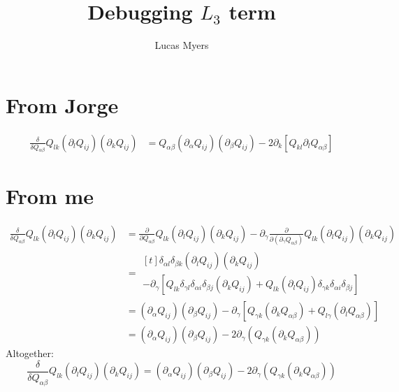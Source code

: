 \documentclass[reqno]{article}
\begin{document}
\title{Debugging $L_3$ term}
\author{Lucas Myers}
\maketitle

\section{From Jorge}

\begin{equation}
\begin{split}
    \frac{\delta}{\delta Q_{\alpha \beta}} Q_{lk} (\partial_{l}Q_{ij})(\partial_{k}Q_{ij})
    &=
    Q_{\alpha\beta} (\partial_\alpha Q_{ij})(\partial_\beta Q_{ij})
    - 2 \partial_k [Q_{kl} \partial_l Q_{\alpha \beta}]
\end{split}
\end{equation}

\section{From me}

\begin{equation}
\begin{split}
    \frac{\delta}{\delta Q_{\alpha \beta}} Q_{lk} \left( \partial_l Q_{ij} \right) \left( \partial_k Q_{ij} \right)
    &=
    \frac{\partial}{\partial Q_{\alpha \beta}} Q_{lk} \left( \partial_l Q_{ij} \right) \left( \partial_k Q_{ij} \right) 
    - \partial_\gamma \frac{\partial}{\partial \left(\partial_\gamma Q_{\alpha \beta} \right)}
    Q_{lk} \left( \partial_l Q_{ij} \right) \left( \partial_k Q_{ij} \right) \\
    &=
    \begin{multlined}[t]
    \delta_{\alpha l} \delta_{\beta k} \left( \partial_l Q_{ij} \right) \left( \partial_k Q_{ij} \right) \\
    - \partial_\gamma \left[ Q_{lk} \delta_{\gamma l} \delta_{\alpha i} \delta_{\beta j} \left( \partial_k Q_{ij} \right)
    + Q_{lk} \left( \partial_l Q_{ij} \right) \delta_{\gamma k } \delta_{\alpha i} \delta_{\beta j}
    \right]
    \end{multlined} \\
    &= 
    \left( \partial_\alpha Q_{ij} \right) \left( \partial_\beta Q_{ij} \right)
    - \partial_\gamma \left[ Q_{\gamma k} \left( \partial_k Q_{\alpha \beta} \right)
    + Q_{l \gamma} \left( \partial_l Q_{\alpha \beta} \right) \right] \\
    &= 
    \left( \partial_\alpha Q_{ij} \right) \left( \partial_\beta Q_{ij} \right)
    - 2 \partial_\gamma \left( Q_{\gamma k} \left( \partial_k Q_{\alpha \beta} \right) \right)
\end{split}
\end{equation}
Altogether:
\begin{equation}
    \frac{\delta}{\delta Q_{\alpha \beta}} Q_{lk} \left( \partial_l Q_{ij} \right) \left( \partial_k Q_{ij} \right)
    =
    \left( \partial_\alpha Q_{ij} \right) \left( \partial_\beta Q_{ij} \right)
    - 2 \partial_\gamma \left( Q_{\gamma k} \left( \partial_k Q_{\alpha \beta} \right) \right)
\end{equation}
\end{document}
